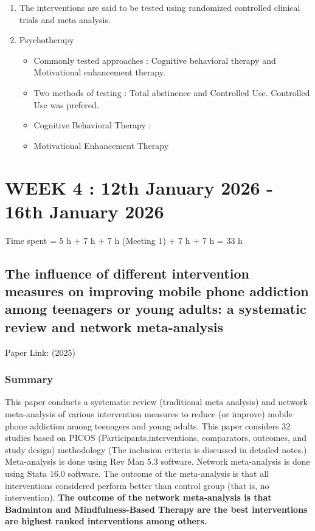 \documentclass{article}
\begin{document}
\begin{enumerate}
    \item The interventions are said to be tested using randomized controlled clinical trials and meta analysis.
    \item Psychotherapy 
    \begin{itemize}
        \item Commonly tested approaches : Cognitive behavioral therapy and Motivational enhancement therapy.
        \item Two methods of testing : Total abstinence and Controlled Use. Controlled Use was prefered.
        \item Cognitive Behavioral Therapy : 
        \item Motivational Enhancement Therapy  
    \end{itemize}

\end{enumerate}

\newpage
\section{WEEK 4 : 12th January 2026 - 16th January 2026}

Time spent = 5 h + 7 h + 7 h (Meeting 1) + 7 h + 7 h = 33 h

\subsection{The influence of different intervention measures on improving mobile phone addiction among teenagers or young adults: a systematic review and network meta-analysis}
Paper Link: \cite{frontiers2025technological} (2025)
\subsubsection{Summary}
This paper conducts a systematic review (traditional meta analysis) and network meta-analysis of various intervention measures to reduce (or improve) mobile phone addiction among teenagers and young adults.
This paper considers 32 studies based on PICOS (Participants,interventions, comparators, outcomes, and study design) methodology (The inclusion criteria is discussed in detailed notes.).
Meta-analysis is done using Rev Man 5.3 software. Network meta-analysis is done using Stata 16.0 software. 
The outcome of the meta-analysis is that all interventions considered perform better than control group (that is, no intervention). 
\textbf{The outcome of the network meta-analysis is that Badminton and Mindfulness-Based Therapy are the best interventions are highest ranked interventions among others.}
\end{document}
